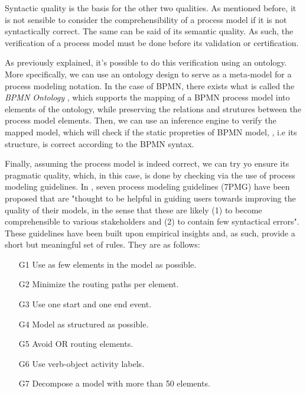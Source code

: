\documentclass[a4paper,twoside]{article}
\begin{document}
Syntactic quality is the basis for the other two qualities. As mentioned before, it is not sensible to consider the comprehensibility of a process model if it is not syntactically correct. The same can be said of its semantic quality. As such, the verification of a process model must be done before its validation or certification.

As previously explained, it's possible to do this verification using an ontology. More specifically, we can use an ontology design to serve as a meta-model for a process modeling notation. In the case of BPMN, there exists what is called the \textit{BPMN Ontology} \cite{Rospocher2014foisbpmn}, which supports the mapping of a BPMN process model into elements of the ontology, while preserving the relations and strutures between the process model elements. Then, we can use an inference engine to verify the mapped model, which will check if the static propreties of BPMN model, , i.e its structure, is correct according to the BPMN syntax.






Finally, assuming the process model is indeed correct, we can try yo ensure its pragmatic quality, which, in this case, is done by checking via the use of process modeling guidelines.  In \cite{Mendling2010}, seven process modeling guidelines (7PMG) have been proposed that are "thought to be helpful in guiding users towards improving the quality of their models, in the sense that these are likely (1) to become comprehensible to various stakeholders and (2) to contain few syntactical errors". These guidelines have been built upon empirical insights and, as such, provide a short but meaningful set of rules. They are as follows:
\begin{enumerate}
	\item[G1] Use as few elements in the model as possible.
	\item[G2] Minimize the routing paths per element.
	\item[G3] Use one start and one end event.
	\item[G4] Model as structured as possible. 
	\item[G5] Avoid OR routing elements.
	\item[G6] Use verb-object activity labels.
	\item[G7] Decompose a model with more than 50 elements.
\end{enumerate}
\end{document}

